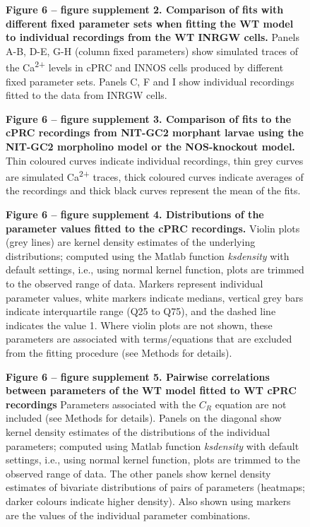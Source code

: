 \documentclass[
  10pt,
  onecolumn]{article}
\begin{document}
\begin{figure}
\centering

\caption{\textbf{Figure 6 -- figure supplement 2. Comparison of fits
with different fixed parameter sets when fitting the WT model to
individual recordings from the WT INRGW cells.} Panels A-B, D-E, G-H
(column fixed parameters) show simulated traces of the
Ca\textsuperscript{2+} levels in cPRC and INNOS cells produced by
different fixed parameter sets. Panels C, F and I show individual
recordings fitted to the data from INRGW cells.}
\end{figure}

\begin{figure}
\centering

\caption{\textbf{Figure 6 -- figure supplement 3. Comparison of fits to
the cPRC recordings from NIT-GC2 morphant larvae using the NIT-GC2
morpholino model or the NOS-knockout model.} Thin coloured curves
indicate individual recordings, thin grey curves are simulated
Ca\textsuperscript{2+} traces, thick coloured curves indicate averages
of the recordings and thick black curves represent the mean of the
fits.}
\end{figure}

\begin{figure}
\centering

\caption{\textbf{Figure 6 -- figure supplement 4. Distributions of the
parameter values fitted to the cPRC recordings.} Violin plots (grey
lines) are kernel density estimates of the underlying distributions;
computed using the Matlab function \emph{ksdensity} with default
settings, i.e., using normal kernel function, plots are trimmed to the
observed range of data. Markers represent individual parameter values,
white markers indicate medians, vertical grey bars indicate
interquartile range (Q25 to Q75), and the dashed line indicates the
value 1. Where violin plots are not shown, these parameters are
associated with terms/equations that are excluded from the fitting
procedure (see Methods for details).}
\end{figure}

\begin{figure}
\centering

\caption{\textbf{Figure 6 -- figure supplement 5. Pairwise correlations
between parameters of the WT model fitted to WT cPRC recordings}
Parameters associated with the \(C_R\) equation are not included (see
Methods for details). Panels on the diagonal show kernel density
estimates of the distributions of the individual parameters; computed
using Matlab function \emph{ksdensity} with default settings, i.e.,
using normal kernel function, plots are trimmed to the observed range of
data. The other panels show kernel density estimates of bivariate
distributions of pairs of parameters (heatmaps; darker colours indicate
higher density). Also shown using markers are the values of the
individual parameter combinations.}
\end{figure}
\end{document}
